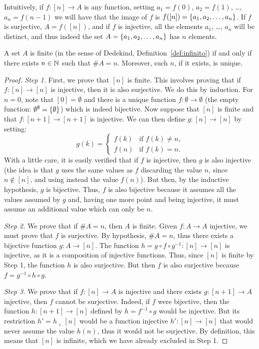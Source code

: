 Intuitively, if $f\colon [n]\to A$ is any function, 
setting $a_1=f(0)$, $a_2=f(1)$, \dots, $a_{n}=f(n-1)$ 
we will have that the image of $f$ is $f([n]) = {\left\{ a_1,a_2,\dots,a_n \right\}}$.
If $f$ is surjective, $A=f([n])$, and if $f$ is injective, 
all the elements $a_1$, \dots, $a_n$ will be distinct,
and thus indeed the set $A={\left\{ a_1,a_2,\dots,a_n \right\}}$
has $n$ elements.

\begin{theorem}
  \label{th:cardinali_finiti}%
A set $A$ is finite
(in the sense of Dedekind, Definition~\ref{def:infinito})
if and only if there exists $n\in {\mathbb N}$ such that $\#A = n$.
Moreover, such $n$, if it exists, is unique.
\end{theorem}
\begin{proof}
\emph{Step 1.} First, we prove that $[n]$ is finite.
This involves proving that if $f\colon [n]\to [n]$ is injective, then it is also
surjective.
We do this by induction. 
For $n=0$, note that $[0]=\emptyset$ and there is a unique function $f\colon
\emptyset \to \emptyset$
(the empty function: $\emptyset^\emptyset = {\left\{ \emptyset \right\}}$)
which is indeed bijective.
Now suppose that $[n]$ is finite and that $f\colon [n+1]\to [n+1]$ is injective.
We can then define $g\colon[n]\to[n]$ by setting:
\[
  g(k) = \begin{cases}
    f(k) & \text{if $f(k)\neq n$,}\\
    f(n) & \text{if $f(k)=n$.}
  \end{cases}
\]
With a little care, it is easily verified that if $f$ is injective, then $g$ is
also injective
(the idea is that $g$ uses the same values as $f$ discarding the value $n$,
since $n\not \in [n]$,
and using instead the value $f(n)$).
But then, by the inductive hypothesis, $g$ is bijective.
Thus, $f$ is also bijective because it assumes all the values assumed by $g$  
and, having one more point and being injective, it must assume an additional
value which can only be $n$.

\emph{Step 2.}
We prove that if $\#A=n$, then $A$ is finite.
Given $f\colon A\to A$ injective, we must prove that $f$ is surjective.
By hypothesis, $\#A=n$, thus there exists a bijective function $g\colon A\to
[n]$.
The function $h=g\circ f\circ g^{-1}\colon [n]\to [n]$ is injective, as it is a
composition of injective functions.
Thus, since $[n]$ is finite by Step 1, the function $h$ is also surjective.
But then $f$ is also surjective because $f=g^{-1}\circ h\circ g$.

\emph{Step 3.} We prove that if $f\colon[n]\to A$ is injective
and there exists $g\colon[n+1]\to A$ injective, then $f$ cannot 
be surjective.
Indeed, if $f$ were bijective, then the function
$h\colon [n+1]\to [n]$ defined by $h=f^{-1}\circ g$ 
would be injective.
But its restriction $h'=h \llcorner [n]$ would be a function
injective $h'\colon[n]\to[n]$ that would never assume the value 
$h(n)$, thus it would not be surjective.
By definition, this means that $[n]$ is infinite, 
which we have already excluded in Step 1.


\end{proof}
